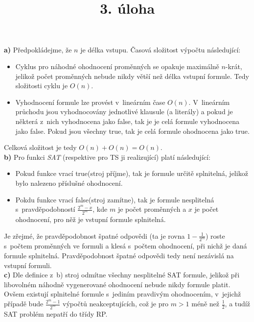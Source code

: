 \documentclass[a4paper]{article}
\title {3. úloha}
\newcommand{\fls}{false}
\newcommand{\tre}{true}
\begin{document}
\section*{}
\textbf{a)} Předpokládejme, že $n$ je délka vstupu.
Časová složitost výpočtu následující:
\begin{itemize}
    \item Cyklus pro náhodné ohodnocení proměnných se opakuje maximálně $n$-krát, jelikož počet proměnných nebude nikdy větší než
     délka vstupní formule.
    Tedy složitosti cyklu je $O(n)$.
    \item Vyhodnocení formule lze provést v~lineárním čase $O(n)$.
    V~lineárním průchodu jsou vyhodnocovány jednotlivé klausule (a literály) a pokud je některá z~nich vyhodnocena jako \fls, tak je
    je celá formule vyhodnocena jako \fls.
    Pokud jsou všechny \tre, tak je celá formule ohodnocena jako \tre.
\end{itemize}
Celková složitost je tedy $O(n)+O(n)=O(n)$.
\\

\noindent\textbf{b)} Pro funkci \emph{SAT} (respektive pro TS ji realizující) platí následující:
\begin{itemize}
    \item Pokud funkce vrací \tre (stroj příjme), tak je formule určitě splnitelná, jelikož bylo nalezeno příslušné ohodnocení.
    \item Pokdu funkce vrací \fls (stroj zamítne), tak je formule nesplitelná s~pravděpodobností $\frac{2^m-x}{2^m}$, kde $m$ je počet proměnných a
    $x$ je počet ohodnocení, pro něž je vstupní formule splnitelná.
\end{itemize}
Je zřejmé, že pravděpodobnost špatné odpovědi (ta je rovna $1-\frac{1}{2^m}$) roste s~počtem proměnných ve formuli a
klesá s~počtem ohodnocení, při nichž je daná formule splnitelná.
Pravděpodobnost špatné odpovědi tedy není nezávislá na vstupní formuli.
\\

\noindent\textbf{c)} Dle definice z~b) stroj odmítne všechny nesplitelné SAT formule, jelikož při libovolném náhodně vygenerované ohodnocení nebude
nikdy formule platit.
Ovšem existují splnitelné formule s~jediním pravdivým ohodnocením, v~jejichž případě bude $\frac{2^m-1}{2^m}$ výpočtů neakceptujících,
což je pro $m>1$ méně než $\frac{1}{2}$, a tudíž SAT problém nepatří do třídy RP.

\pagebreak
\end{document}
